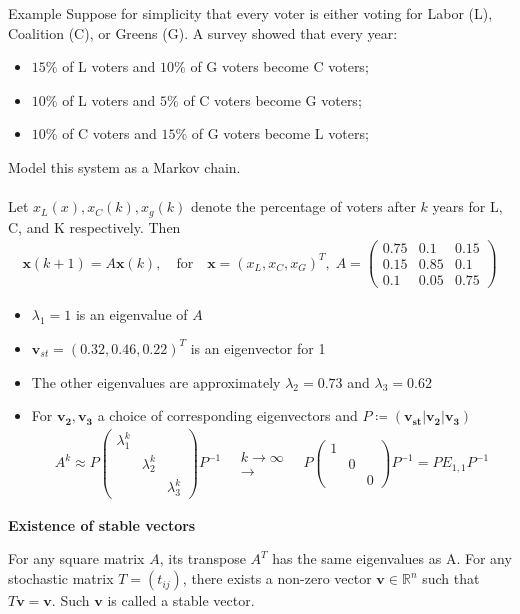 \documentclass{report}
\renewcommand{\vec}{\mathbf}
\newcommand{\cvec}[1]{ \begin{pmatrix} #1 \end{pmatrix} }
\begin{document}
\begin{enumerate}
			\begin{question}{Example}
				Suppose for simplicity that every voter is either voting for Labor (L), Coalition (C), or Greens (G). A survey showed that every year:
				\begin{itemize}
					\item $15\%$ of L voters and $10\%$ of G voters become C voters;
					\item $10\%$ of L voters and $5\%$ of C voters become G voters;
					\item $10\%$ of C voters and $15\%$ of G voters become L voters;
				\end{itemize}
				Model this system as a Markov chain.
				\\ \\
				Let $x_L(x), x_C(k), x_g(k)$ denote the percentage of voters after $k$ years for L, C, and K respectively. Then
				\begin{align*}
					\vec{x}(k + 1) = A \vec{x} (k), \quad \text{for} \quad \vec{x} = (x_L, x_C, x_G)^T, \; A = \cvec{0.75&0.1&0.15\\0.15&0.85&0.1\\0.1&0.05&0.75}
				\end{align*}
				\begin{itemize}
					\item $\lambda_1 = 1$ is an eigenvalue of $A$
					\item $\vec{v}_{st} = (0.32, 0.46, 0.22)^T$ is an eigenvector for 1
					\item The other eigenvalues are approximately $\lambda_2 = 0.73$ and $\lambda_3 = 0.62$
					\item For $\vec{v_2}, \vec{v_3}$ a choice of corresponding eigenvectors and $P \coloneq (\vec{v_{st}} | \vec{v_2} | \vec{v_3})$
						\begin{align*}
							A^k \approx P \cvec{\lambda_1^k&&\\&\lambda_2^k&\\&&\lambda_3^k} P^{-1} \quad \substack{k \to \infty \\ \longrightarrow} \quad P \cvec{1&&\\&0&\\&&0} P^{-1} = P E_{1,1}P^{-1}
						\end{align*}
				\end{itemize}
			\end{question}

			\textbf{Existence of stable vectors}

			For any square matrix $A$, its transpose $A^T$ has the same eigenvalues as A. For any stochastic matrix $T = (t_{ij})$, there exists a non-zero vector $\vec{v} \in \mathbb{R}^n$ such that $T \vec{v} = \vec{v}$. Such $\vec{v}$ is called a stable vector.


\end{enumerate}
\end{document}
